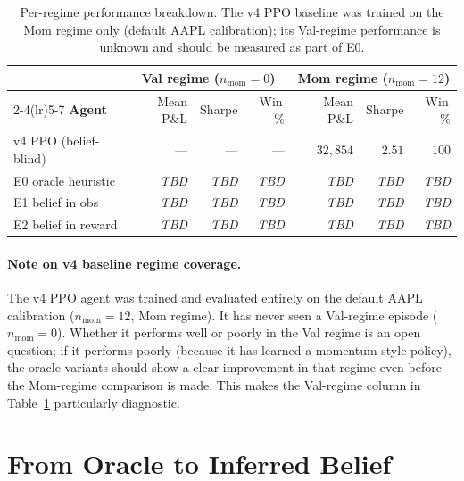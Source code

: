 \documentclass[11pt]{article}
\begin{document}
\begin{table}[H]
\centering
\begin{tabular}{lrrrrrr}
\toprule
& \multicolumn{3}{c}{\textbf{Val regime} ($n_\text{mom}=0$)}
& \multicolumn{3}{c}{\textbf{Mom regime} ($n_\text{mom}=12$)} \\
\cmidrule(lr){2-4}\cmidrule(lr){5-7}
\textbf{Agent} & Mean P\&L & Sharpe & Win\,\% & Mean P\&L & Sharpe & Win\,\% \\
\midrule
v4 PPO (belief-blind) & --- & --- & --- & $32{,}854$ & $2.51$ & $100$ \\
E0 oracle heuristic   & \emph{TBD} & \emph{TBD} & \emph{TBD} & \emph{TBD} & \emph{TBD} & \emph{TBD} \\
E1 belief in obs      & \emph{TBD} & \emph{TBD} & \emph{TBD} & \emph{TBD} & \emph{TBD} & \emph{TBD} \\
E2 belief in reward   & \emph{TBD} & \emph{TBD} & \emph{TBD} & \emph{TBD} & \emph{TBD} & \emph{TBD} \\
\bottomrule
\end{tabular}
\caption{Per-regime performance breakdown.
         The v4 PPO baseline was trained on the Mom regime only (default
         AAPL calibration); its Val-regime performance is unknown and
         should be measured as part of E0.}
\label{tab:results_stratified}
\end{table}

\paragraph{Note on v4 baseline regime coverage.}
The v4 PPO agent was trained and evaluated entirely on the default AAPL
calibration ($n_\text{mom}=12$, Mom regime).
It has never seen a Val-regime episode ($n_\text{mom}=0$).
Whether it performs well or poorly in the Val regime is an open question;
if it performs poorly (because it has learned a momentum-style policy),
the oracle variants should show a clear improvement in that regime even
before the Mom-regime comparison is made.
This makes the Val-regime column in Table~\ref{tab:results_stratified}
particularly diagnostic.

\section{From Oracle to Inferred Belief}
\label{sec:next}
\end{document}
